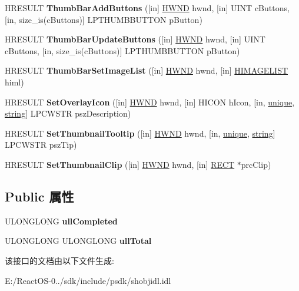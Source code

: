 \begin{DoxyCompactItemize}
H\+R\+E\+S\+U\+LT {\bfseries Thumb\+Bar\+Add\+Buttons} (\mbox{[}in\mbox{]} \hyperlink{interfacevoid}{H\+W\+ND} hwnd, \mbox{[}in\mbox{]} U\+I\+NT c\+Buttons, \mbox{[}in, size\+\_\+is(c\+Buttons)\mbox{]} L\+P\+T\+H\+U\+M\+B\+B\+U\+T\+T\+ON p\+Button)
\item 
\mbox{\label{interface_i_taskbar_list3_aaf04a9f085f2e13ee8ac21ce78269747}} 
H\+R\+E\+S\+U\+LT {\bfseries Thumb\+Bar\+Update\+Buttons} (\mbox{[}in\mbox{]} \hyperlink{interfacevoid}{H\+W\+ND} hwnd, \mbox{[}in\mbox{]} U\+I\+NT c\+Buttons, \mbox{[}in, size\+\_\+is(c\+Buttons)\mbox{]} L\+P\+T\+H\+U\+M\+B\+B\+U\+T\+T\+ON p\+Button)
\item 
\mbox{\label{interface_i_taskbar_list3_a6c34a6a8170f62509363285c7614620a}} 
H\+R\+E\+S\+U\+LT {\bfseries Thumb\+Bar\+Set\+Image\+List} (\mbox{[}in\mbox{]} \hyperlink{interfacevoid}{H\+W\+ND} hwnd, \mbox{[}in\mbox{]} \hyperlink{struct___i_m_a_g_e_l_i_s_t}{H\+I\+M\+A\+G\+E\+L\+I\+ST} himl)
\item 
\mbox{\label{interface_i_taskbar_list3_a3047376aad0a6ff8cf5ad3d4c4de0e21}} 
H\+R\+E\+S\+U\+LT {\bfseries Set\+Overlay\+Icon} (\mbox{[}in\mbox{]} \hyperlink{interfacevoid}{H\+W\+ND} hwnd, \mbox{[}in\mbox{]} H\+I\+C\+ON h\+Icon, \mbox{[}in, \hyperlink{interfaceunique}{unique}, \hyperlink{structstring}{string}\mbox{]} L\+P\+C\+W\+S\+TR psz\+Description)
\item 
\mbox{\label{interface_i_taskbar_list3_a8fa860135852547a00dea0ce271e22cf}} 
H\+R\+E\+S\+U\+LT {\bfseries Set\+Thumbnail\+Tooltip} (\mbox{[}in\mbox{]} \hyperlink{interfacevoid}{H\+W\+ND} hwnd, \mbox{[}in, \hyperlink{interfaceunique}{unique}, \hyperlink{structstring}{string}\mbox{]} L\+P\+C\+W\+S\+TR psz\+Tip)
\item 
\mbox{\label{interface_i_taskbar_list3_a3fcfeb464c804260c35c0d3a0da7b0a7}} 
H\+R\+E\+S\+U\+LT {\bfseries Set\+Thumbnail\+Clip} (\mbox{[}in\mbox{]} \hyperlink{interfacevoid}{H\+W\+ND} hwnd, \mbox{[}in\mbox{]} \hyperlink{structtag_r_e_c_t}{R\+E\+CT} $\ast$prc\+Clip)
\end{DoxyCompactItemize}
\subsection*{Public 属性}
\begin{DoxyCompactItemize}
\item 
\mbox{\label{interface_i_taskbar_list3_af3f7e91fe4caa567b8c555f55141e5e0}} 
U\+L\+O\+N\+G\+L\+O\+NG {\bfseries ull\+Completed}
\item 
\mbox{\label{interface_i_taskbar_list3_a653b5bf6a2840009cc9ce7b1b869c573}} 
U\+L\+O\+N\+G\+L\+O\+NG U\+L\+O\+N\+G\+L\+O\+NG {\bfseries ull\+Total}
\end{DoxyCompactItemize}


该接口的文档由以下文件生成\+:\begin{DoxyCompactItemize}
\item 
E\+:/\+React\+O\+S-\/0../sdk/include/psdk/shobjidl.\+idl\end{DoxyCompactItemize}
